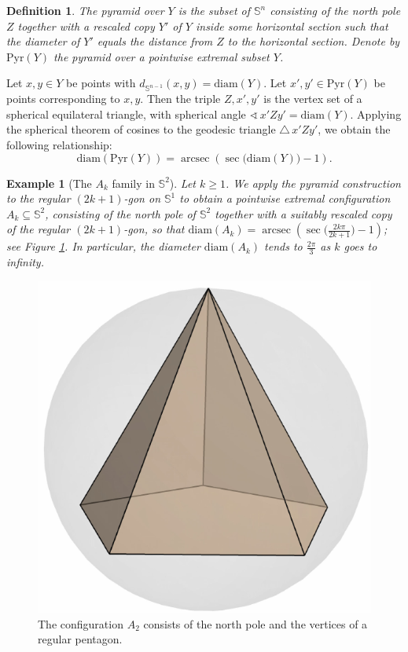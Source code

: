 \documentclass[12pt]{amsart}
\DeclareMathOperator{\arcsec}{arcsec}
\theoremstyle{plain}
\newtheorem{definition}[theorem]{Definition}
\newtheorem{example}[theorem]{Example}
\newcommand{\Sp}{\mathbb{S}}
\newcommand{\diam}{\mathrm{diam}}
\newcommand{\np}{Z}
\numberwithin{equation}{section}
\begin{document}
\begin{definition}
The \emph{pyramid over $Y$} is the subset of $\Sp^n$ consisting of the
north pole $\np$ together with a rescaled copy $Y'$ of $Y$ inside some
horizontal section such that the diameter of $Y'$ equals the distance
from $\np$ to the horizontal section.  Denote by $\mathrm{Pyr}(Y)$ the
pyramid over a pointwise extremal subset $Y$.
\end{definition}

Let $x,y\in Y$ be points with $d_{\Sp^{n-1}}(x, y) = \diam(Y)$.  Let
$x', y'\in\mathrm{Pyr}(Y)$ be points corresponding to $x,y$.
Then the triple $\np, x', y'$ is the vertex set of a spherical
equilateral triangle, with spherical angle $\sphericalangle\,x'\np
y'=\diam(Y)$.  Applying the spherical theorem of cosines to the
geodesic triangle $\triangle\,x'\np y'$, we obtain the following
relationship:
$$\diam(\mathrm{Pyr}(Y)) = \arcsec\left(\sec\big(\diam(Y)\big)-1\right).$$


\begin{example}[The $A_k$ family in $\Sp^2$]\label{example:A_k}
Let $k\geq1$.  We apply the pyramid construction to the regular
$(2k+1)$-gon on $\Sp^1$ to obtain a pointwise extremal configuration
$A_k \subseteq \Sp^2$, consisting of the north pole of $\Sp^2$
together with a suitably rescaled copy of the regular $(2k+1)$-gon, so
that $\diam
(A_k)=\arcsec\left(\sec\big(\frac{2k\pi}{2k+1}\big)-1\right)$; see
Figure \ref{fig:penta-pyr}.  In particular, the
  diameter $\diam(A_k)$ tends to $\frac{2\pi}{3}$ as $k$ goes to
  infinity.
\end{example}

\begin{figure}[H]
	\centering
	\includegraphics[scale=0.4]{./figures/small_A2.pdf}
	\caption{The configuration $A_2$ consists of the north pole and the vertices of a regular pentagon. }\label{fig:penta-pyr}
\end{figure}
\end{document}
